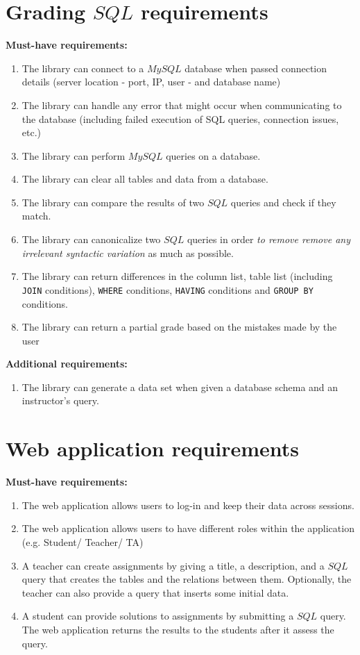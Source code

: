 \section*{Grading $SQL$ requirements}
\textbf{Must-have requirements:}
\begin{enumerate}[label=R-\arabic*]
  \item The library can connect to a $MySQL$ database when passed
    connection details (server location - port, IP, user - and database name)
  \item The library can handle any error that might occur when communicating to
    the database (including failed execution of SQL queries, connection issues, etc.)
  \item The library can perform $MySQL$ queries on a database.
  \item The library can clear all tables and data from a database.
  \item The library can compare the results of two $SQL$ queries and check if they
    match.
  \item The library can canonicalize two $SQL$ queries in order
    \textit{to remove remove any irrelevant syntactic variation} as much as
    possible.
  \cite{literature:xdata}
  \item The library can return differences in the column list, table list (including \texttt{JOIN}
    conditions), \texttt{WHERE} conditions, \texttt{HAVING} conditions and \texttt{GROUP BY} conditions.
  \item The library can return a partial grade based on the mistakes made
  by the user
\end{enumerate}

\textbf{Additional requirements:}
\begin{enumerate}[resume,label=R-OPT-\arabic*]
  \item The library can generate a data set when given a database schema
  and an instructor's query.
\end{enumerate}

\section*{Web application requirements}
\textbf{Must-have requirements:}
\begin{enumerate}[resume*,label=R-\arabic*]
  \item The web application allows users to log-in and keep their data
    across sessions.
  \item The web application allows users to have different roles within the
    application (e.g. Student/ Teacher/ TA)
  \item  A teacher can create assignments by giving a title, a description,
    and a $SQL$ query that creates the tables and the relations between them.
    Optionally, the teacher can also provide a query that inserts some
    initial data.
  \item A student can provide solutions to assignments by submitting a
  $SQL$ query. The web application returns the results to the students
  after it assess the query.
\end{enumerate}

